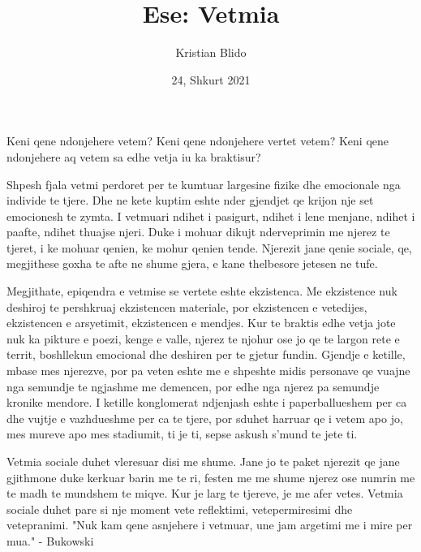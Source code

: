 \documentclass[12pt, a4paper]{article}
\title{Ese: Vetmia}
\author{Kristian Blido}
\date{24, Shkurt 2021}
\begin{document}
	\maketitle
Keni qene ndonjehere vetem? Keni qene ndonjehere vertet vetem? Keni qene ndonjehere aq vetem sa edhe vetja iu ka braktisur?

Shpesh fjala vetmi perdoret per te kumtuar largesine fizike dhe emocionale nga individe te tjere. Dhe ne kete kuptim eshte nder gjendjet qe krijon nje set emocionesh te zymta. I vetmuari ndihet i pasigurt, ndihet i lene menjane, ndihet i paafte, ndihet thuajse njeri. Duke i mohuar dikujt nderveprimin me njerez te tjeret, i ke mohuar qenien, ke mohur qenien tende. Njerezit jane qenie sociale, qe, megjithese goxha te afte ne shume gjera, e kane thelbesore jetesen ne tufe.

Megjithate, epiqendra e vetmise se vertete eshte ekzistenca. Me ekzistence nuk deshiroj te pershkruaj ekzistencen materiale, por ekzistencen e vetedijes, ekzistencen e arsyetimit, ekzistencen e mendjes. Kur te braktis edhe vetja jote nuk ka pikture e poezi, kenge e valle, njerez te njohur ose jo qe te largon rete e territ, boshllekun emocional dhe deshiren per te gjetur fundin. Gjendje e ketille, mbase mes njerezve, por pa veten eshte me e shpeshte midis personave qe vuajne nga semundje te ngjashme me demencen, por edhe nga njerez pa semundje kronike mendore. I ketille konglomerat ndjenjash eshte i paperballueshem per ca dhe vujtje e vazhdueshme per ca te tjere, por sduhet harruar qe i vetem apo jo, mes mureve apo mes stadiumit, ti je ti, sepse askush s'mund te jete ti.

Vetmia sociale duhet vleresuar disi me shume. Jane jo te paket njerezit qe jane gjithmone duke kerkuar barin me te ri, festen me me shume njerez ose numrin me te madh te mundshem te miqve. Kur je larg te tjereve, je me afer vetes. Vetmia sociale duhet pare si nje moment vete reflektimi, vetepermiresimi dhe vetepranimi. "Nuk kam qene asnjehere i vetmuar, une jam argetimi me i mire per mua." - Bukowski
\end{document}
